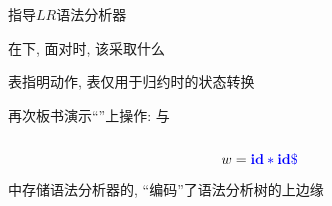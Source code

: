 \begin{frame}{}
  \begin{center}
    指导$LR$语法分析器

    \vspace{0.30cm}

    \vspace{0.10cm}
    在下, 面对时, 该采取什么

    \vspace{0.30cm}
    \purple{\action{}} 表指明动作, \purple{\goto{}} 表仅用于归约时的状态转换
  \end{center}
\end{frame}

\begin{frame}{}
  \begin{center}

    \vspace{0.30cm}
    
  \end{center}
\end{frame}

\begin{frame}{}
  \begin{center}
    再次板书演示``''上操作: 与

    \begin{columns}
        
    \end{columns}

    \[
      w = \textcolor{blue}{\text{\bf id} \ast \text{\bf id} \$}
    \]

    中存储语法分析器的, ``编码''了语法分析树的上边缘
  \end{center}
\end{frame}

\begin{frame}{}
  \begin{center}

    
  \end{center}
\end{frame}

